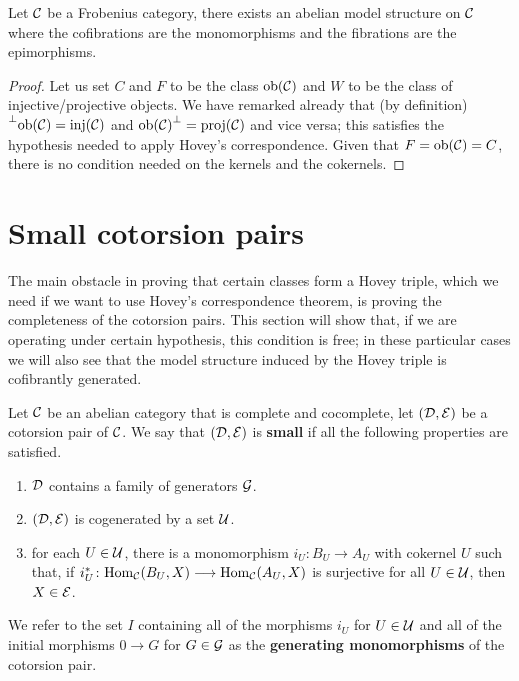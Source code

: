 \begin{proposition}
	Let $\mathcal{C}$ be a Frobenius category, there exists an abelian model structure on $\mathcal{C}$  where the cofibrations are the monomorphisms and the fibrations are the epimorphisms.
\end{proposition}

\begin{proof}
	Let us set $C$ and $F$ to be the class $\mathrm{ob}(\mathcal{C})$ and $W$ to be the class of injective/projective objects. We have remarked already that (by definition) $\prescript{\perp}{}{\mathrm{ob}(\mathcal{C})} = \mathrm{inj}(\mathcal{C})$ and ${\mathrm{ob}(\mathcal{C})}^\perp = \mathrm{proj}(\mathcal{C})$ and vice versa; this satisfies the hypothesis needed to apply Hovey's correspondence. Given that $F = \mathrm{ob}(\mathcal{C}) = C$, there is no condition needed on the kernels and the cokernels.
\end{proof}



\section{Small cotorsion pairs}

The main obstacle in proving that certain classes form a Hovey triple, which we need if we want to use Hovey's correspondence theorem, is proving the completeness of the cotorsion pairs. This section will show that, if we are operating under certain hypothesis, this condition is free; in these particular cases we will also see that the model structure induced by the Hovey triple is cofibrantly generated.

\begin{definition}
	Let $\mathcal{C}$ be an abelian category that is complete and cocomplete, let $(\mathcal{D}, \mathcal{E})$ be a cotorsion pair of $\mathcal{C}$. We say that $(\mathcal{D}, \mathcal{E})$ is \textbf{small} if all the following properties are satisfied.
	\begin{enumerate}
		\itemsep0em 
		\item $\mathcal{D}$ contains a family of generators $\mathcal{G}$.
		\item $(\mathcal{D}, \mathcal{E})$ is cogenerated by a set  $\mathcal{U}$.
		\item for each $U \in \mathcal{U}$, there is a monomorphism $i_U\colon B_U \longrightarrow A_U$ with cokernel $U$ such that, if $i_U^*\colon \mathrm{Hom}_{\mathcal{C}}(B_U, X) \longrightarrow \mathrm{Hom}_{\mathcal{C}}(A_U, X)$ is surjective for all $U\in \mathcal{U}$, then $X \in \mathcal{E}$.
	\end{enumerate}
	We refer to the set $I$ containing all of the morphisms $i_U$ for $U \in \mathcal{U}$ and all of the initial morphisms $0 \longrightarrow G$ for $G \in \mathcal{G}$ as the \textbf{generating monomorphisms} of the cotorsion pair.
\end{definition}

